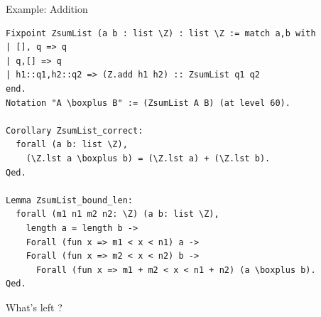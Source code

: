 \documentclass[8pt]{beamer}
\begin{document}
%
%

\begin{frame}[fragile]{Example: Addition}
  \begin{center}
\begin{lstlisting}[language=Coq, caption=Addition, label=cod:languageC91]
Fixpoint ZsumList (a b : list \Z) : list \Z := match a,b with
| [], q => q
| q,[] => q
| h1::q1,h2::q2 => (Z.add h1 h2) :: ZsumList q1 q2
end.
Notation "A \boxplus B" := (ZsumList A B) (at level 60).

Corollary ZsumList_correct:
  forall (a b: list \Z),
    (\Z.lst a \boxplus b) = (\Z.lst a) + (\Z.lst b).
Qed.

Lemma ZsumList_bound_len:
  forall (m1 n1 m2 n2: \Z) (a b: list \Z),
    length a = length b ->
    Forall (fun x => m1 < x < n1) a ->
    Forall (fun x => m2 < x < n2) b ->
      Forall (fun x => m1 + m2 < x < n1 + n2) (a \boxplus b).
Qed.
\end{lstlisting}

  \end{center}
\end{frame}



\begin{frame}[standout]
  \Huge What's left ?
\end{frame}
\end{document}
